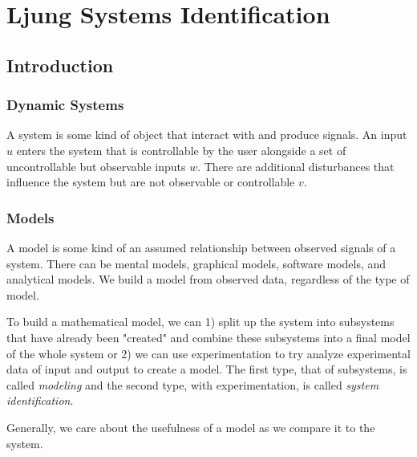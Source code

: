 \section{Ljung Systems Identification}
\subsection{Introduction}
\subsubsection{Dynamic Systems}
A system is some kind of object that interact with and produce signals.
An input $u$ enters the system that is controllable by the user alongside a set of uncontrollable but observable inputs $w$.
There are additional disturbances that influence the system but are not observable or controllable $v$.

\subsubsection{Models}
A model is some kind of an assumed relationship between observed signals of a system.
There can be mental models, graphical models, software models, and analytical models.
We build a model from observed data, regardless of the type of model.

To build a mathematical model, we can 1) split up the system into subsystems that have already been "created" and combine these subsystems into a final model of the whole system or 2) we can use experimentation to try analyze experimental data of input and output to create a model.
The first type, that of subsystems, is called \textit{modeling} and the second type, with experimentation, is called \textit{system identification}.

Generally, we care about the usefulness of a model as we compare it to the system.


